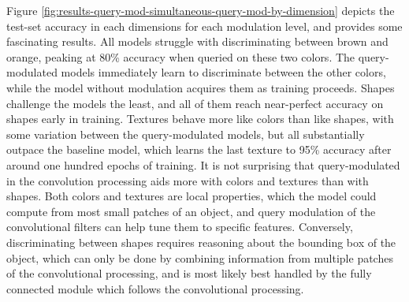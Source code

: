 Figure \ref{fig:results-query-mod-simultaneous-query-mod-by-dimension} depicts the test-set accuracy in each dimensions for each modulation level, and provides some fascinating results. All models struggle with discriminating between brown and orange, peaking at 80\% accuracy when queried on these two colors. The query-modulated models immediately learn to discriminate between the other colors, while the model without modulation acquires them as training proceeds. Shapes challenge the models the least, and all of them reach near-perfect accuracy on shapes early in training. Textures behave more like colors than like shapes, with some variation between the query-modulated models, but all substantially outpace the baseline model, which learns the last texture to 95\% accuracy after around one hundred epochs of training. It is not surprising that query-modulated in the convolution processing aids more with colors and textures than with shapes. Both colors and textures are local properties, which the model could compute from most small patches of an object, and query modulation of the convolutional filters can help tune them to specific features. Conversely, discriminating between shapes requires reasoning about the bounding box of the object, which can only be done by combining information from multiple patches of the convolutional processing, and is most likely best handled by the fully connected module which follows the convolutional processing.
\FloatBarrier